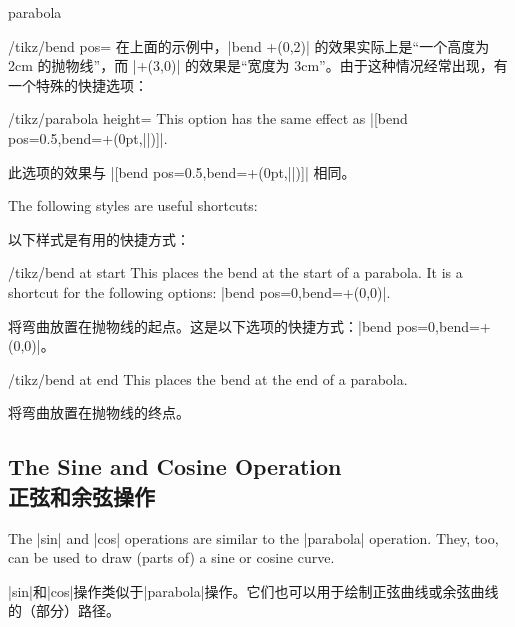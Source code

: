 \begin{pathoperation}{parabola}{}
\begin{key}{/tikz/bend pos=}
        在上面的示例中，|bend +(0,2)| 的效果实际上是“一个高度为 2cm 的抛物线”，而 |+(3,0)| 的效果是“宽度为 3cm”。由于这种情况经常出现，有一个特殊的快捷选项：

        \begin{key}{/tikz/parabola height=}
            This option has the same effect as          |[bend pos=0.5,bend={+(0pt,||)}]|.

            此选项的效果与 |[bend pos=0.5,bend={+(0pt,||)}]| 相同。

\begin{codeexample}[]
\end{codeexample}
        \end{key}
    \end{key}

    The following styles are useful shortcuts:

    以下样式是有用的快捷方式：

    \begin{stylekey}{/tikz/bend at start}
        This places the bend at the start of a parabola. It is a shortcut for
        the following options: |bend pos=0,bend={+(0,0)}|.

        将弯曲放置在抛物线的起点。这是以下选项的快捷方式：|bend pos=0,bend={+(0,0)}|。
    \end{stylekey}

    \begin{stylekey}{/tikz/bend at end}
        This places the bend at the end of a parabola.

        将弯曲放置在抛物线的终点。
    \end{stylekey}
\end{pathoperation}


\subsection{The Sine and Cosine Operation\\正弦和余弦操作}

The |sin| and |cos| operations are similar to the |parabola| operation. They,
too, can be used to draw (parts of) a sine or cosine curve.

|sin|和|cos|操作类似于|parabola|操作。它们也可以用于绘制正弦曲线或余弦曲线的（部分）路径。


